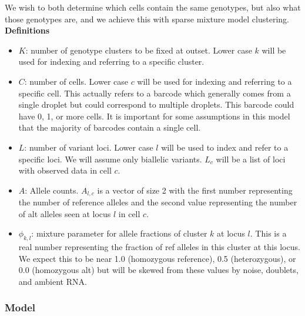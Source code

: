We wish to both determine which cells contain the same genotypes, but also what those genotypes are, and we achieve this with sparse mixture model clustering. \\

\textbf{Definitions}
\begin{itemize}
\item $K$: number of genotype clusters to be fixed at outset. Lower case $k$ will be used for indexing and referring to a specific cluster.
\item $C$: number of cells. Lower case $c$ will be used for indexing and referring to a specific cell. This actually refers to a barcode which generally comes from a single droplet but could correspond to multiple droplets. This barcode could have 0, 1, or more cells. It is important for some assumptions in this model that the majority of barcodes contain a single cell.
\item $L$: number of variant loci. Lower case $l$ will be used to index and refer to a specific loci. We will assume only biallelic variants. $L_c$ will be a list of loci with observed data in cell $c$.
\item $A$: Allele counts. $A_{l,c}$ is a vector of size 2 with the first number representing the number of reference alleles and the second value representing the number of alt alleles seen at locus $l$ in cell $c$.
\item $\phi_{k,l}$: mixture parameter for allele fractions of cluster $k$ at locus $l$. This is a real number representing the fraction of ref alleles in this cluster at this locus. We expect this to be near 1.0 (homozygous reference), 0.5 (heterozygous), or 0.0 (homozygous alt) but will be skewed from these values by noise, doublets, and ambient RNA.
\end{itemize} 

\noindent
\subsubsection{Model}

